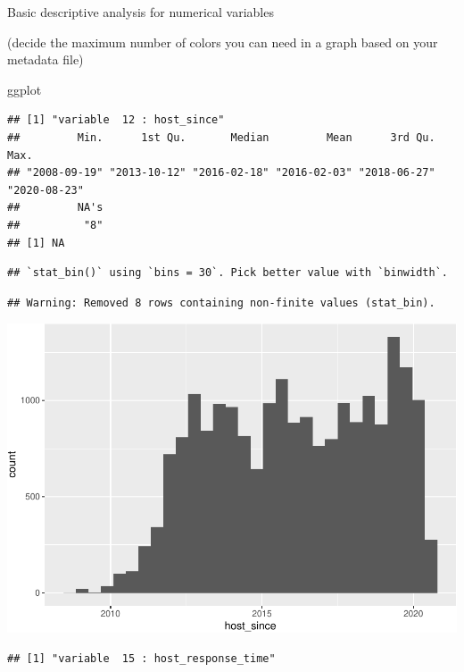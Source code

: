 Basic descriptive analysis for numerical variables

(decide the maximum number of colors you can need in a graph based on
your metadata file)

ggplot

\begin{verbatim}
## [1] "variable  12 : host_since"
##         Min.      1st Qu.       Median         Mean      3rd Qu.         Max. 
## "2008-09-19" "2013-10-12" "2016-02-18" "2016-02-03" "2018-06-27" "2020-08-23" 
##         NA's 
##          "8" 
## [1] NA
\end{verbatim}

\begin{verbatim}
## `stat_bin()` using `bins = 30`. Pick better value with `binwidth`.
\end{verbatim}

\begin{verbatim}
## Warning: Removed 8 rows containing non-finite values (stat_bin).
\end{verbatim}

\includegraphics{anal_files/figure-latex/unnamed-chunk-9-1.pdf}

\begin{verbatim}
## [1] "variable  15 : host_response_time"
\end{verbatim}

